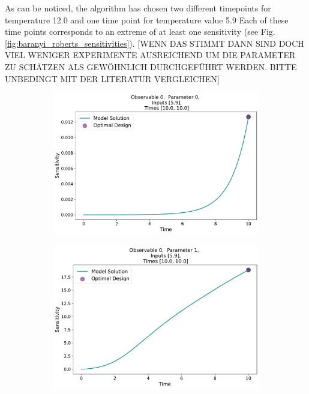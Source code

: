 \documentclass[10pt,A4paper]{article}
\begin{document}
As can be noticed, the algorithm has chosen two different timepoints for temperature 12.0 and  one time point for temperature value 5.9
Each of these time points corresponds to an extreme of at least one sensitivity (see Fig. \ref{fig:baranyi_roberts_sensitivities}). [WENN DAS STIMMT DANN SIND DOCH VIEL WENIGER EXPERIMENTE AUSREICHEND UM DIE PARAMETER ZU SCHÄTZEN ALS GEWÖHNLICH DURCHGEFÜHRT WERDEN. BITTE UNBEDINGT MIT DER LITERATUR VERGLEICHEN]
\begin{figure}[H]
    \begin{subfigure}{.9\textwidth}
      \centering
      \includegraphics[scale=0.35]{Figures/Sensitivity_Results_baranyi_roberts_ode_fisher_determinant_rel_sensit_cont_2times_2temps_000_x_00_p_00.pdf}
    \end{subfigure}
    \begin{subfigure}{.9\textwidth}
      \centering
      \includegraphics[scale=0.35]{Figures/Sensitivity_Results_baranyi_roberts_ode_fisher_determinant_rel_sensit_cont_2times_2temps_000_x_00_p_01.pdf}

\end{subfigure}
\end{figure}
\end{document}
